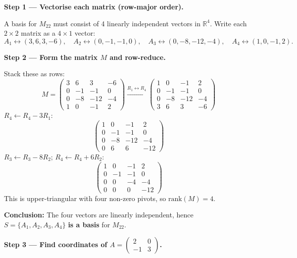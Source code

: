 \documentclass[12pt,a3paper]{article}
\begin{document}
\begin{tcolorbox}[enhanced,breakable,colback=cC!4,colframe=cC,
  boxrule=0.8pt,arc=5pt,
  title={\textbf{Answer}},
  fonttitle=\bfseries\color{white},colbacktitle=cC]

\textbf{Step 1 --- Vectorise each matrix (row-major order).}

A basis for $M_{22}$ must consist of 4 linearly independent vectors in
$\mathbb{R}^4$.  Write each $2\times2$ matrix as a $4\times1$ vector:
\[
  A_1\leftrightarrow(3,6,3,-6),\quad
  A_2\leftrightarrow(0,-1,-1,0),\quad
  A_3\leftrightarrow(0,-8,-12,-4),\quad
  A_4\leftrightarrow(1,0,-1,2).
\]

\textbf{Step 2 --- Form the matrix $M$ and row-reduce.}

Stack these as rows:
\[
M = \begin{pmatrix}
3 & 6 & 3 & -6\\
0 & -1 & -1 & 0\\
0 & -8 & -12 & -4\\
1 & 0 & -1 & 2
\end{pmatrix}
\xrightarrow{R_1\leftrightarrow R_4}
\begin{pmatrix}
1 & 0 & -1 & 2\\
0 & -1 & -1 & 0\\
0 & -8 & -12 & -4\\
3 & 6 & 3 & -6
\end{pmatrix}
\]
$R_4 \leftarrow R_4 - 3R_1$:
\[
\begin{pmatrix}
1 & 0 & -1 & 2\\
0 & -1 & -1 & 0\\
0 & -8 & -12 & -4\\
0 & 6 & 6 & -12
\end{pmatrix}
\]
$R_3 \leftarrow R_3 - 8R_2$; $R_4 \leftarrow R_4 + 6R_2$:
\[
\begin{pmatrix}
1 & 0 & -1 & 2\\
0 & -1 & -1 & 0\\
0 & 0 & -4 & -4\\
0 & 0 & 0 & -12
\end{pmatrix}
\]
This is upper-triangular with four non-zero pivots, so $\mathrm{rank}(M)=4$.

\textbf{Conclusion:} The four vectors are linearly independent, hence
$S = \{A_1,A_2,A_3,A_4\}$ \textbf{is a basis} for $M_{22}$.

\medskip
\textbf{Step 3 --- Find coordinates of $A=\begin{pmatrix}2&0\\-1&3\end{pmatrix}$.}


\end{tcolorbox}
\end{document}
